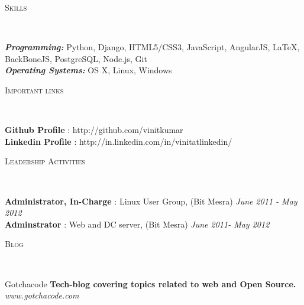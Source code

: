 \documentclass[9pt]{article}
\newenvironment{changemargin}[2]{%
  \begin{list}{}{%
    \setlength{\topsep}{0pt}%
    \setlength{\leftmargin}{#1}%
    \setlength{\rightmargin}{#2}%
    \setlength{\listparindent}{\parindent}%
    \setlength{\itemindent}{\parindent}%
    \setlength{\parsep}{\parskip}%
  }%
  \item[]}{\end{list}
}
\newcommand{\lineover}{
	\begin{changemargin}{-0.05in}{-0.05in}
		\vspace*{-8pt}
		\hrulefill \\
		\vspace*{-2pt}
	\end{changemargin}
}
\newcommand{\header}[1]{
	\begin{changemargin}{-0.5in}{-0.5in}
		\scshape{#1}\\
  	\lineover
	\end{changemargin}
}
\newenvironment{body} {
	\vspace*{-16pt}
	\begin{changemargin}{-0.25in}{-0.5in}
  }	
	{\end{changemargin}
}
\begin{document}
\smallskip


\header{Skills}

\begin{body}
	\vspace{14pt}
	\emph{\textbf{Programming:}}{} Python, Django, 
	HTML5/CSS3, JavaScript, AngularJS, \LaTeX, BackBoneJS, PostgreSQL, Node.js, Git\\
	\medskip
	\emph{\textbf{Operating Systems:}}{} OS X, Linux,  Windows\\
\end{body}

\smallskip


\header{Important links}

\begin{body}
	\vspace{14pt}
	\textbf{Github Profile} : http://github.com/vinitkumar \hfill{}\\
	\smallskip
	\textbf{Linkedin Profile} : http://in.linkedin.com/in/vinitatlinkedin/ \hfill{}\\
\end{body}

\smallskip

\header{Leadership Activities}

\begin{body}
	\vspace{14pt}
	\textbf{Administrator, In-Charge} : Linux User Group, (Bit Mesra) \hfill {} \emph{June 2011 - May 2012}\\
	\smallskip
	\textbf{Adminstrator} : Web and DC server, (Bit Mesra) \hfill{} \emph{June 2011- May 2012}\\
\end{body}

\smallskip

\header{Blog}

\begin{body}
	\vspace{14pt}
	Gotchacode \textbf{Tech-blog covering topics related to web and Open Source.} \emph{ www.gotchacode.com}\\
	\smallskip
\end{body}

\smallskip
\end{document}
